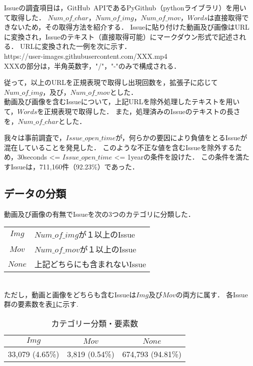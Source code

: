Issueの調査項目は，GitHub~APIであるPyGithub（pythonライブラリ）を用いて取得した．
$Num\_of\_char$，$Num\_of\_img$，$Num\_of\_mov$，$Words$は直接取得できないため，その取得方法を紹介する．
Issueに貼り付けた動画及び画像はURLに変換され，Issueのテキスト（直接取得可能）にマークダウン形式で記述される．
URLに変換された一例を次に示す．\\

https://user-images.githubusercontent.com/XXX.mp4 \\

XXXの部分は，半角英数字，"/"，"-"のみで構成される．

従って，以上のURLを正規表現で取得し出現回数を，拡張子に応じて$Num\_of\_img$，及び，$Num\_of\_mov$とした．\\

動画及び画像を含むIssueについて，上記URLを除外処理したテキストを用いて，$Words$を正規表現で取得した．
また，処理済みのIssueのテキストの長さを，$Num\_of\_char$とした．


我々は事前調査で，$Issue\_open\_time$が，何らかの要因により負値をとるIssueが混在していることを発見した．
このような不正な値を含むIssueを除外するため，30seconds <= $Issue\_open\_time$ <= 1yearの条件を設けた．
この条件を満たすIssueは，711,160件（92.23\%）であった．


\subsection{データの分類}
動画及び画像の有無でIssueを次の3つのカテゴリに分類した．\\

\begin{tabular}{c l}
    $Img$ & $Num\_of\_img$が１以上のIssue \\
    $Mov$ & $Num\_of\_mov$が１以上のIssue \\
    $None$ & 上記どちらにも含まれないIssue\\ 
\end{tabular} \\

ただし，動画と画像をどちらも含むIssueは$Img$及び$Mov$の両方に属す．
各Issue群の要素数を表\ref{classify_result}に示す. 

\begin{table}[h]
    \begin{center}
    \caption{カテゴリー分類・要素数}
    \begin{tabular}{c|c|c}
        \hline
        $Img$ & $Mov$ & $None$ \\ 
        \hline \hline
        33,079 (4.65\%) & 3,819 (0.54\%) & 674,793 (94.81\%) \\
        \hline
    \end{tabular}
    \label{classify_result}
    \end{center}
\end{table}


